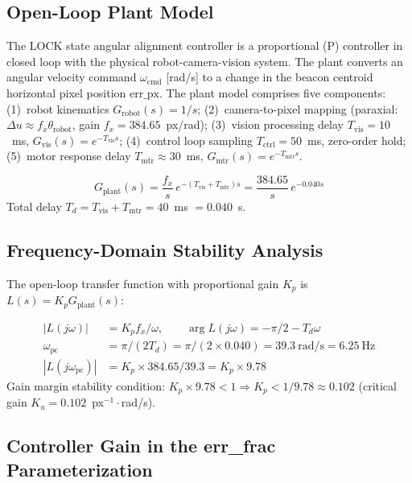 \subsection{Open-Loop Plant Model}

The LOCK state angular alignment controller is a proportional (P) controller in closed loop with the physical robot-camera-vision system. The plant converts an angular velocity command $\omega_{\text{cmd}}$ [rad/s] to a change in the beacon centroid horizontal pixel position $\text{err\_px}$. The plant model comprises five components: (1)~robot kinematics $G_{\text{robot}}(s)=1/s$; (2)~camera-to-pixel mapping (paraxial: $\Delta u \approx f_x\theta_{\text{robot}}$, gain $f_x=384.65$~px/rad); (3)~vision processing delay $T_{\text{vis}}=10$~ms, $G_{\text{vis}}(s)=e^{-T_{\text{vis}}s}$; (4)~control loop sampling $T_{\text{ctrl}}=50$~ms, zero-order hold; (5)~motor response delay $T_{\text{mtr}}\approx30$~ms, $G_{\text{mtr}}(s)=e^{-T_{\text{mtr}}s}$.

\begin{eqblock}
\begin{equation}
G_{\text{plant}}(s) = \frac{f_x}{s}\, e^{-(T_{\text{vis}}+T_{\text{mtr}})s} = \frac{384.65}{s}\, e^{-0.040s}
\end{equation}
Total delay $T_d = T_{\text{vis}} + T_{\text{mtr}} = 40$~ms $= 0.040$~s.
\end{eqblock}

\subsection{Frequency-Domain Stability Analysis}

The open-loop transfer function with proportional gain $K_p$ is $L(s)=K_p G_{\text{plant}}(s)$:

\begin{eqblock}
\begin{align}
|L(j\omega)| &= K_p f_x/\omega, \qquad \arg L(j\omega) = -\pi/2 - T_d\omega \\
\omega_{\text{pc}} &= \pi/(2T_d) = \pi/(2\times0.040) = 39.3~\text{rad/s} = 6.25~\text{Hz} \\
|L(j\omega_{\text{pc}})| &= K_p \times 384.65/39.3 = K_p\times9.78
\end{align}
Gain margin stability condition: $K_p\times9.78 < 1 \Rightarrow K_p < 1/9.78 \approx 0.102$ (critical gain $K_u=0.102$~px$^{-1}\cdot$rad/s).
\end{eqblock}

\subsection{Controller Gain in the err\_frac Parameterization}

